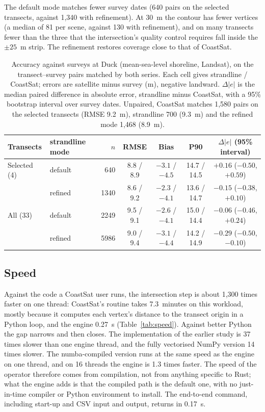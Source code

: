 \documentclass[authoryear,preprint,review,12pt]{elsarticle}
\begin{document}
The default mode matches fewer survey dates (640 pairs on the selected
transects, against 1,340 with refinement). At 30~m the contour has fewer
vertices (a median of 81 per scene, against 130 with refinement), and on many
transects fewer than the three that the intersection's quality control requires
fall inside the $\pm25$~m strip. The refinement restores coverage close to that
of CoastSat.

\begin{table}[t]
  \centering
  \small
  \caption{Accuracy against surveys at Duck (mean-sea-level shoreline,
  Landsat), on the transect--survey pairs matched by both series. Each cell
  gives strandline / CoastSat; errors are satellite minus survey (m), negative
  landward. $\Delta|e|$ is the median paired difference in absolute error,
  strandline minus CoastSat, with a 95\% bootstrap interval over survey
  dates. Unpaired, CoastSat matches 1,580 pairs on the selected transects
  (RMSE 9.2~m), strandline 700 (9.3~m) and the refined mode 1,468 (8.9~m).}
  \label{tab:duck}
  \begin{tabular}{@{}llrcccc@{}}
    \toprule
    Transects & strandline mode & $n$ & RMSE & Bias & P90 & $\Delta|e|$ (95\% interval) \\
    \midrule
    Selected (4) & default & 640  & 8.8 / 8.9 & $-3.1$ / $-4.5$ & 14.7 / 14.5 & $+0.16$ ($-0.50$, $+0.59$) \\
                 & refined & 1340 & 8.6 / 9.2 & $-2.3$ / $-4.1$ & 13.6 / 14.7 & $-0.15$ ($-0.38$, $+0.10$) \\
    All (33)     & default & 2249 & 9.5 / 9.1 & $-2.6$ / $-4.1$ & 15.0 / 14.4 & $-0.06$ ($-0.46$, $+0.24$) \\
                 & refined & 5986 & 9.0 / 9.4 & $-3.1$ / $-4.4$ & 14.2 / 14.9 & $-0.29$ ($-0.50$, $-0.10$) \\
    \bottomrule
  \end{tabular}
\end{table}

\subsection{Speed}
Against the code a CoastSat user runs, the intersection step is about 1,300
times faster on one thread: CoastSat's routine takes 7.3~minutes on this
workload, mostly because it computes each vertex's distance to the transect
origin in a Python loop, and the engine 0.27~s (Table~\ref{tab:speed}). Against
better Python the gap narrows and then closes. The implementation of the
earlier study is 37 times slower than one engine thread, and the fully
vectorised NumPy version 14 times slower. The numba-compiled version runs at
the same speed as the engine on one thread, and on 16 threads the engine is
1.3 times faster. The speed of the operator therefore comes from compilation,
not from anything specific to Rust; what the engine adds is that the compiled
path is the default one, with no just-in-time compiler or Python environment
to install. The end-to-end command, including start-up and CSV input and
output, returns in 0.17~s.
\end{document}
